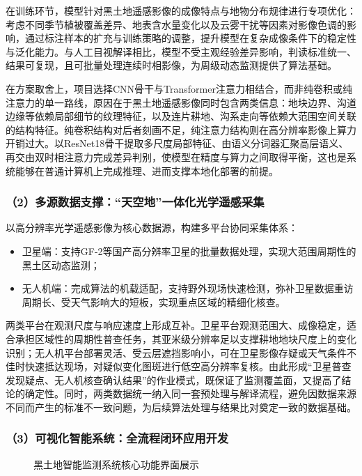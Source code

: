 \documentclass[12pt, a4paper]{ctexart}
\begin{document}
在训练环节，模型针对黑土地遥感影像的成像特点与地物分布规律进行专项优化：考虑不同季节植被覆盖差异、地表含水量变化以及云雾干扰等因素对影像色调的影响，通过标注样本的扩充与训练策略的调整，提升模型在复杂成像条件下的稳定性与泛化能力。与人工目视解译相比，模型不受主观经验差异影响，判读标准统一、结果可复现，且可批量处理连续时相影像，为周级动态监测提供了算法基础。

在方案取舍上，项目选择CNN骨干与Transformer注意力相结合，而非纯卷积或纯注意力的单一路线，原因在于黑土地遥感影像同时包含两类信息：地块边界、沟道边缘等依赖局部细节的纹理特征，以及连片耕地、沟系走向等依赖大范围空间关联的结构特征。纯卷积结构对后者刻画不足，纯注意力结构则在高分辨率影像上算力开销过大。以ResNet18骨干提取多尺度局部特征、由语义分词器汇聚高层语义、再交由双时相注意力完成差异判别，使模型在精度与算力之间取得平衡，这也是系统能够在普通计算机上完成推理、进而支撑本地化部署的前提。

\subsubsection{（2）多源数据支撑：“天空地”一体化光学遥感采集}

以高分辨率光学遥感影像为核心数据源，构建多平台协同采集体系：

\begin{itemize}
    \item 卫星端：支持GF-2等国产高分辨率卫星的批量数据处理，实现大范围周期性的黑土区动态监测；
    \item 无人机端：完成算法的机载适配，支持野外现场快速检测，弥补卫星数据重访周期长、受天气影响大的短板，实现重点区域的精细化核查。
\end{itemize}

两类平台在观测尺度与响应速度上形成互补。卫星平台观测范围大、成像稳定，适合承担区域性的周期性普查任务，其亚米级分辨率足以支撑耕地地块尺度上的变化识别；无人机平台部署灵活、受云层遮挡影响小，可在卫星影像存疑或天气条件不佳时快速抵达现场，对疑似变化图斑进行低空高分辨率复核。由此形成“卫星普查发现疑点、无人机核查确认结果”的作业模式，既保证了监测覆盖面，又提高了结论的确定性。同时，两类数据统一纳入同一套预处理与解译流程，避免因数据来源不同而产生的标准不一致问题，为后续算法处理与结果比对奠定一致的数据基础。

\subsubsection{（3）可视化智能系统：全流程闭环应用开发}

\begin{figure}[htbp]
    \centering
    \caption{黑土地智能监测系统核心功能界面展示}
    \label{fig:1}
\end{figure}
\end{document}
